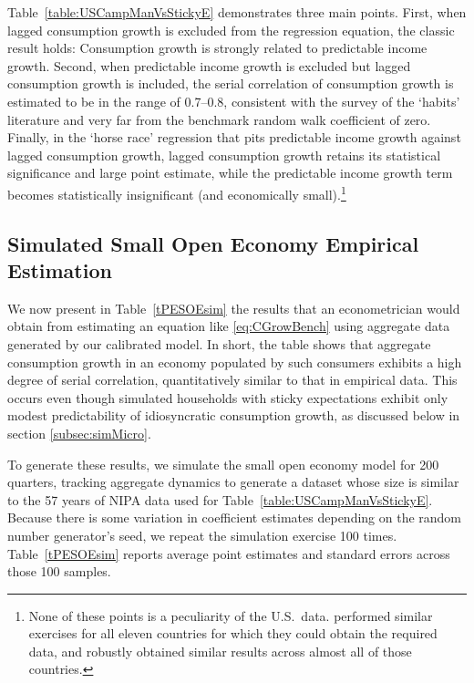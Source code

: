 \documentclass[titlepage]{./econtex}
\begin{document}
Table~\ref{table:USCampManVsStickyE} demonstrates three main points.  First, when lagged consumption growth is excluded from the regression equation, the classic \cite{cmModel} result holds: Consumption growth is strongly related to predictable income growth.  Second, when predictable income growth is excluded but lagged consumption growth is included, the serial correlation of consumption growth is estimated to be in the range of 0.7--0.8, consistent with the \cite{hrsHabit} survey of the `habits' literature and very far from the benchmark random walk coefficient of zero.  Finally, in the `horse race' regression that pits predictable income growth against lagged consumption growth, lagged consumption growth retains its statistical significance and large point estimate, while the predictable income growth term becomes statistically insignificant (and economically small).\footnote{None of these points is a peculiarity of the U.S.\ data.  \cite{cssIntlStickyC} performed similar exercises for all eleven countries for which they could obtain the required data, and robustly obtained similar results across almost all of those countries.}


\subsection{Simulated Small Open Economy Empirical Estimation}
\label{subsec:SOEResults}

We now present in Table~\ref{tPESOEsim} the results that an econometrician would obtain from estimating an equation like \eqref{eq:CGrowBench} using aggregate data generated by our calibrated model.  In short, the table shows that aggregate consumption growth in an economy populated by such consumers exhibits a high degree of serial correlation, quantitatively similar to that in empirical data.  This occurs even though simulated households with sticky expectations exhibit only modest predictability of idiosyncratic consumption growth, as discussed below in section \ref{subsec:simMicro}.

To generate these results, we simulate the small open economy model for 200 quarters, tracking aggregate dynamics to generate a dataset whose size is similar to the 57 years of NIPA data used for Table~\ref{table:USCampManVsStickyE}.  Because there is some variation in coefficient estimates depending on the random number generator's seed, we repeat the simulation exercise 100 times.  Table~\ref{tPESOEsim} reports average point estimates and standard errors across those 100 samples.
\end{document}
